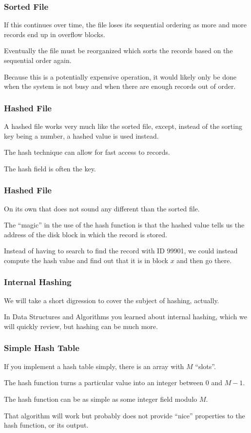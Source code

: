 \begin{frame}
\frametitle{Sorted File}

If this continues over time, the file loses its sequential ordering as more and more records end up in overflow blocks. 

Eventually the file must be reorganized which sorts the records based on the sequential order again. 

Because this is a potentially expensive operation, it would likely only be done when the system is not busy and when there are enough records out of order.

\end{frame}



\begin{frame}
\frametitle{Hashed File}

A hashed file works very much like the sorted file, except, instead of the sorting key being a number, a hashed value is used instead. 

The hash technique can allow for fast access to records. 

The hash field is often the key. 

\end{frame}

\begin{frame}
\frametitle{Hashed File}

On its own that does not sound any different than the sorted file. 

The ``magic'' in the use of the hash function is that the hashed value tells us the address of the disk block in which the record is stored. 

Instead of having to search to find the record with ID 99901, we could instead compute the hash value and find out that it is in block $x$ and then go there.

\end{frame}



\begin{frame}
\frametitle{Internal Hashing}

We will take a short digression to cover the subject of hashing, actually. 

In Data Structures and Algorithms you learned about \alert{internal hashing}, which we will quickly review, but hashing can be much more.


\end{frame}


\begin{frame}
\frametitle{Simple Hash Table}

If you implement a hash table simply, there is an array with $M$ ``slots''. 

The hash function turns a particular value into an integer between $0$ and $M-1$. 

The hash function can be as simple as some integer field modulo $M$. 

That algorithm will work but probably does not provide ``nice'' properties to the hash function, or its output. 

\end{frame}


